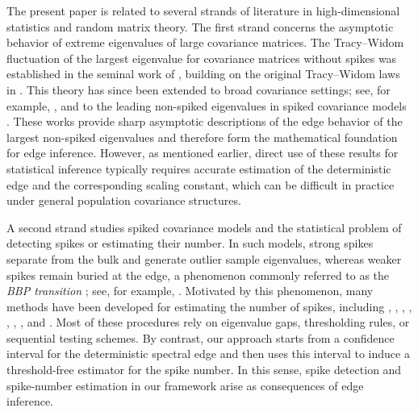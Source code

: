 \documentclass[12pt]{article}
\theoremstyle{plain}
\numberwithin{equation}{section}
\begin{document}
The present paper is related to several strands of literature in high-dimensional statistics and random matrix theory. The first strand concerns the asymptotic behavior of extreme eigenvalues of large covariance matrices. The Tracy--Widom fluctuation of the largest eigenvalue for covariance matrices without spikes was established in the seminal work of \citep{Johnstone2001}, building on the original Tracy--Widom laws in \citep{tracy1994level,tracy1996orthogonal}. This theory has since been extended to broad covariance settings; see, for example, \citep{el2007tracy,FanJohnstone2022,lee2016tracy,knowles2017anisotropic,Bao2015,Ding&Yang2018,Fan2019separable}, and to the leading non-spiked eigenvalues in spiked covariance models \citep{9779233}. These works provide sharp asymptotic descriptions of the edge behavior of the largest non-spiked eigenvalues and therefore form the mathematical foundation for edge inference. However, as mentioned earlier, direct use of these results for statistical inference typically requires accurate estimation of the deterministic edge and the corresponding scaling constant, which can be difficult in practice under general population covariance structures.

A second strand studies spiked covariance models \citep{Johnstone2001,ding2021spiked} and the statistical problem of detecting spikes or estimating their number. In such models,  strong spikes separate from the bulk and generate outlier sample eigenvalues, whereas weaker spikes remain buried at the edge, a phenomenon commonly referred to as the \emph{BBP transition} \citep{BaikBenArousPeche2005}; see, for example, \citep{bloemendal2016principal,ding2021spiked,Paul2007Spiked}. Motivated by this phenomenon, many methods have been developed for estimating the number of spikes, including \citep{bai2002determining}, \citep{onatski2009formal}, \citep{passemier2014estimation}, \citep{braeken2017empirical}, \citep{dobriban2019deterministic}, \citep{9779233}, \citep{fan2022estimating}, and \citep{ke2023estimation}. Most of these procedures rely on eigenvalue gaps, thresholding rules, or sequential testing schemes. By contrast, our approach starts from a confidence interval for the deterministic spectral edge and then uses this interval to induce a threshold-free estimator for the spike number. In this sense, spike detection and spike-number estimation in our framework arise as consequences of edge inference.
\end{document}
